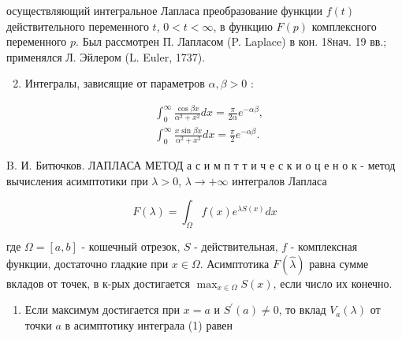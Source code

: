 \documentclass[10pt]{article}
\begin{document}
осуществляющий интегральное Лапласа преобразование функции $f(t)$ действительного переменного $t$, $0<t<\infty$, в функцию $F(p)$ комплексного переменного $p$. Был рассмотрен П. Лапласом (P. Laplace) в кон. 18нач. 19 вв.; применялся Л. Эйлером (L. Euler, 1737).



\begin{enumerate}

  \setcounter{enumi}{1}

  \item Интегралы, зависящие от параметров $\alpha, \beta>0$ :

\end{enumerate}



\[

\begin{aligned}

& \int_{0}^{\infty} \frac{\cos \beta x}{\alpha^{2}+x^{2}} d x=\frac{\pi}{2 \alpha} e^{-\alpha \beta}, \\

& \int_{0}^{\infty} \frac{x \sin \beta x}{\alpha^{2}+x^{2}} d x=\frac{\pi}{2} e^{-\alpha \beta} .

\end{aligned}

\]



B. И. Битючков. ЛАПЛАСА МЕТОД а с и м п т т и ч е с к и о ц е н о к - метод вычисления асимптотики при $\lambda>0$, $\lambda \rightarrow+\infty$ интегралов Лапласа



\[

F(\lambda)=\int_{\Omega} f(x) e^{\lambda S(x)} d x

\]



где $\Omega=[a, b]$ - кошечный отрезок, $S$ - действительная, $f$ - комплексная функции, достаточно гладкие при $x \in \Omega$. Асимптотика $F(\hat{\lambda})$ равна сумме вкладов от точек, в к-рых достигается $\max _{x \in \Omega} S(x)$, если число их конечно.



\begin{enumerate}

  \item Если максимум достигается при $x=a$ и $S^{\prime}(a) \neq 0$, то вклад $V_{a}(\lambda)$ от точки $a$ в асимптотику интеграла (1) равен

\end{enumerate}
\end{document}
